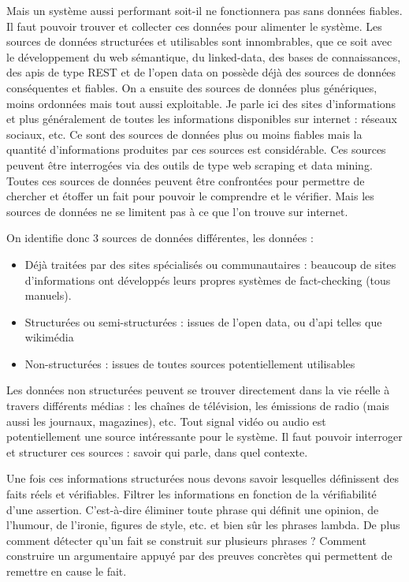 Mais un système aussi performant soit-il ne fonctionnera pas sans données fiables. Il faut pouvoir trouver et collecter ces données pour alimenter le système. Les sources de données structurées et utilisables sont innombrables, que ce soit avec le développement du web sémantique, du linked-data, des bases de connaissances, des apis de type REST et de l'open data on possède déjà des sources de données conséquentes et fiables. On a ensuite des sources de données plus génériques, moins ordonnées mais tout aussi exploitable. Je parle ici des sites d'informations et plus généralement de toutes les informations disponibles sur internet : réseaux sociaux, etc. Ce sont des sources de données plus ou moins fiables mais la quantité d'informations produites par ces sources est considérable. Ces sources peuvent être interrogées via des outils de type web scraping et data mining.
Toutes ces sources de données peuvent être confrontées pour permettre de chercher et étoffer un fait pour pouvoir le comprendre et le vérifier.
Mais les sources de données ne se limitent pas à ce que l'on trouve sur internet.

On identifie donc 3 sources de données différentes, les données : 

\begin{itemize}
    \item Déjà traitées par des sites spécialisés ou communautaires : beaucoup de sites d'informations ont développés leurs propres systèmes de fact-checking (tous manuels). 
    \item Structurées ou semi-structurées : issues de l'open data, ou d'api telles que wikimédia
    \item Non-structurées : issues de toutes sources potentiellement utilisables
\end{itemize}

Les données non structurées peuvent se trouver directement dans la vie réelle à travers différents médias : les chaînes de télévision, les émissions de radio (mais aussi les journaux, magazines), etc. Tout signal vidéo ou audio est potentiellement une source intéressante pour le système. Il faut pouvoir interroger et structurer ces sources : savoir qui parle, dans quel contexte.

Une fois ces informations structurées nous devons savoir lesquelles définissent des faits réels et vérifiables. Filtrer les informations en fonction de la vérifiabilité d'une assertion. C'est-à-dire éliminer toute phrase qui définit une opinion, de l'humour, de l'ironie, figures de style, etc. et bien sûr les phrases lambda. De plus comment détecter qu'un fait se construit sur plusieurs phrases ? Comment construire un argumentaire appuyé par des preuves concrètes qui permettent de remettre en cause le fait.

